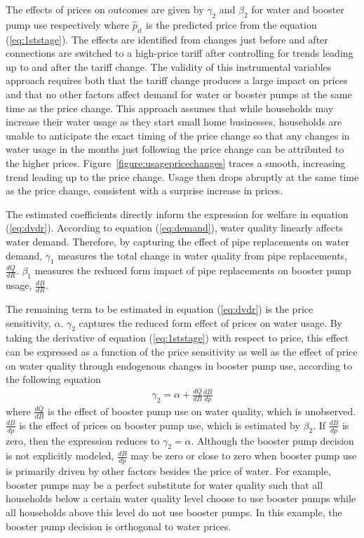\documentclass[12pt,table]{article}
\begin{document}
The effects of prices on outcomes are given by $\gamma_2$ and $\beta_2$ for water and booster pump use respectively where $\hat{p}_{it}$ is the predicted price from the equation (\ref{eq:1ststage}).  The effects are identified from changes just before and after connections are switched to a high-price tariff after controlling for trends leading up to and after the tariff change.  The validity of this instrumental variables approach requires both that the tariff change produces a large impact on prices and that no other factors affect demand for water or booster pumps at the same time as the price change.  This approach assumes that while households may increase their water usage as they start small home businesses, households are unable to anticipate the exact timing of the price change so that any changes in water usage in the months just following the price change can be attributed to the higher prices.  Figure~\ref{figure:usagepricechanges} traces a smooth, increasing trend leading up to the price change.  Usage then drops abruptly at the same time as the price change, consistent with a surprise increase in prices.

The estimated coefficients directly inform the expression for welfare in equation (\ref{eq:dvdr}).  According to equation (\ref{eq:demand}), water quality linearly affects water demand.  Therefore, by capturing the effect of pipe replacements on water demand, $\gamma_1$ measures the total change in water quality from pipe replacements, $\frac{dQ}{dR}$.  $\beta_1$ measures the reduced form impact of pipe replacements on booster pump usage, $\frac{dB}{dR}$.  

The remaining term to be estimated in equation (\ref{eq:dvdr}) is the price sensitivity, $\alpha$.  $\gamma_2$ captures the reduced form effect of prices on water usage.  By taking the derivative of equation (\ref{eq:1ststage}) with respect to price, this effect can be expressed as a function of the price sensitivity as well as the effect of price on water quality through endogenous changes in booster pump use, according to the following equation
\begin{align}
\label{eq:psens}
  \gamma_2 = \alpha +  \frac{dQ}{dB} \frac{dB}{dp}
\end{align}
where $\frac{dQ}{dB}$ is the effect of booster pump use on water quality, which is unobserved.  $\frac{dB}{dp}$ is the effect of prices on booster pump use, which is estimated by $\beta_2$.  If $\frac{dB}{dp}$ is zero, then the expression reduces to $\gamma_2=\alpha$.  Although the booster pump decision is not explicitly modeled, $\frac{dB}{dp}$ may be zero or close to zero when booster pump use is primarily driven by other factors besides the price of water.  For example, booster pumps may be a perfect substitute for water quality such that all households below a certain water quality level choose to use booster pumps while all households above this level do not use booster pumps.  In this example, the booster pump decision is orthogonal to water prices.  
\end{document}
